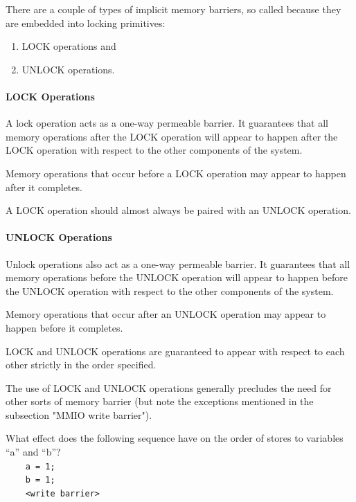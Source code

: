 There are a couple of types of implicit memory barriers, so called
because they are embedded into locking primitives:

\begin{enumerate}
\item	LOCK operations and
\item	UNLOCK operations.
\end{enumerate}

\paragraph{LOCK Operations}

A lock operation acts as a one-way permeable barrier.
It guarantees that all memory
operations after the LOCK operation will appear to happen after the LOCK
operation with respect to the other components of the system.

Memory operations that occur before a LOCK operation may appear to happen
after it completes.

A LOCK operation should almost always be paired with an UNLOCK operation.

\paragraph{UNLOCK Operations}

Unlock operations also act as a one-way permeable barrier.
It guarantees that all
memory operations before the UNLOCK operation will appear to happen before
the UNLOCK operation with respect to the other components of the system.

Memory operations that occur after an UNLOCK operation may appear to
happen before it completes.

LOCK and UNLOCK operations are guaranteed to appear with respect to each
other strictly in the order specified.

The use of LOCK and UNLOCK operations generally precludes the need for
other sorts of memory barrier (but note the exceptions mentioned in the
subsection "MMIO write barrier").

\QuickQuiz{}
	What effect does the following sequence have on the
	order of stores to variables ``a'' and ``b''? \\
	{\tt ~~~~a = 1;} \\
	{\tt ~~~~b = 1;} \\
	{\tt ~~~~<write barrier>}
 \QuickQuizEnd

